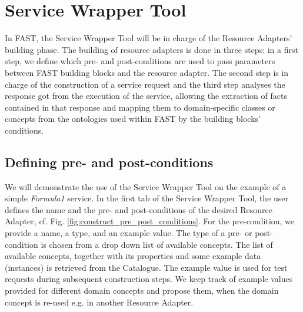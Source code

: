 \documentclass{fast_latex}
\begin{document}
\clearpage
\section{Service Wrapper Tool} %
\label{sec:restful_web_services_wrapper_tool}

In FAST, the Service Wrapper Tool will be in charge of the Resource Adapters' building phase. The building of resource adapters is done in three steps: in a first step, we define which pre- and post-conditions are used to pass parameters between FAST building blocks and the resource adapter. The second step is in charge of the construction of a service request and the third step analyses the response got from the execution of the service, allowing the extraction of facts contained in that response and mapping them to domain-specific classes or concepts from the ontologies used within FAST by the building blocks' conditions.


\subsection{Defining pre- and post-conditions} %
\label{sub:resource_adapter_parameters}

We will demonstrate the use of the Service Wrapper Tool on the example of a simple \emph{Formula1} service. In the first tab of the Service Wrapper Tool, the user defines the name and the pre- and post-conditions of the desired Resource Adapter, cf. Fig. \ref{fig:construct_pre_post_conditions}. For the pre-condition, we provide a name, a type, and an example value. The type of a pre- or post-condition is chosen from a drop down list of available concepts. The list of available concepts, together with its properties and some example data (instances) is retrieved from the Catalogue. The example value is used for test requests during subsequent construction steps. We keep track of example values provided for different domain concepts and propose them, when the domain concept is re-used e.g. in another Resource Adapter. 
\end{document}
